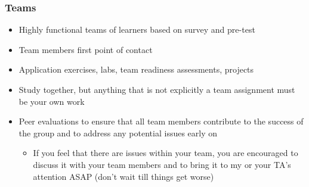\documentclass[slidestop,compress,mathserif,12pt,t,professionalfonts,xcolor=table]{beamer}
\begin{document}
\begin{frame}
\frametitle{Teams}

\begin{itemize}
\item Highly functional teams of learners based on survey and pre-test

\item Team members first point of contact

\item Application exercises, labs, team readiness assessments, projects

\item Study together, but anything that is not explicitly a team assignment must be your own work

\item Peer evaluations to ensure that all team members contribute to the success of the group and to address any potential issues early on
\begin{itemize}
\item If you feel that there are issues within your team, you are encouraged to discuss it with your team members and to bring it to my or your TA's attention ASAP (don't wait till things get worse)
\end{itemize}

\end{itemize}


\end{frame}

\end{document}
